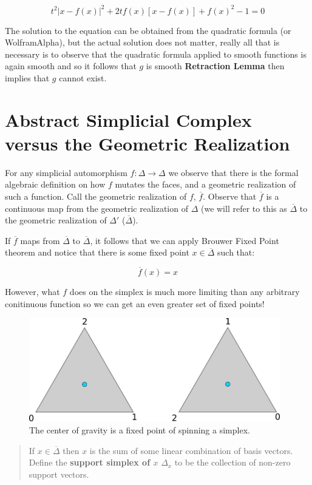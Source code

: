 \documentclass[a4paper]{article}
\newcommand{\ol}{\overline}
\begin{document}
$$t^2|x - f(x)|^2 + 2tf(x)[x - f(x)] + f(x)^2 - 1 = 0$$

The solution to the equation can be obtained from the quadratic formula (or WolframAlpha), but the actual solution does not matter, really all that is necessary is to observe that the quadratic formula applied to smooth functions is again smooth and so it follows that $g$ is smooth \textbf{Retraction Lemma} then implies that $g$ cannot exist.

\section{Abstract Simplicial Complex versus the Geometric Realization}

For any simplicial automorphism $f : \Delta \to \Delta$ we observe that there is the formal algebraic definition on how $f$ mutates the faces, and a geometric realization of such a function. Call the geometric realization of $f$, $\ol{f}$. Observe that $\ol{f}$ is a continuous map from the geometric realization of $\Delta$ (we will refer to this as $\ol{\Delta}$ to the geometric realization of $\Delta'$ ($\ol{\Delta}$).

If $\ol{f}$ maps from $\ol{\Delta}$ to $\ol{\Delta}$, it follows that we can apply Brouwer Fixed Point theorem and notice that there is some fixed point $x \in \ol{\Delta}$ such that:

$$\ol{f}(x) = x$$

However, what $f$ does on the simplex is much more limiting than any arbitrary conitinuous function so we can get an even greater set of fixed points!

\begin{figure}
    \includegraphics[height=4.5cm]{rotate}
    \centering
    \caption{The center of gravity is a fixed point of spinning a simplex.}
\end{figure}

\begin{quote}
    If $x \in \ol{\Delta}$ then $x$ is the sum of some linear combination of basis vectors. Define the \textbf{support simplex of $x$} $\Delta_x$ to be the collection of non-zero support vectors.
\end{quote}
\end{document}
